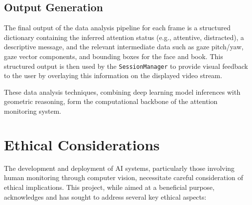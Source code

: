 \subsection{Output Generation}
The final output of the data analysis pipeline for each frame is a structured dictionary containing the inferred attention status (e.g., attentive, distracted), a descriptive message, and the relevant intermediate data such as gaze pitch/yaw, gaze vector components, and bounding boxes for the face and book. This structured output is then used by the \texttt{SessionManager} to provide visual feedback to the user by overlaying this information on the displayed video stream.

These data analysis techniques, combining deep learning model inferences with geometric reasoning, form the computational backbone of the attention monitoring system.

\section{Ethical Considerations}
The development and deployment of AI systems, particularly those involving human monitoring through computer vision, necessitate careful consideration of ethical implications. This project, while aimed at a beneficial purpose, acknowledges and has sought to address several key ethical aspects:

